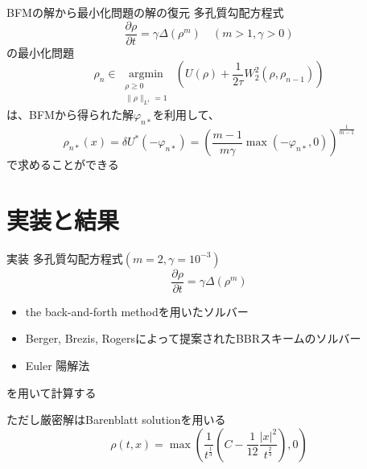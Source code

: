 \documentclass[dvipdfmx, 12pt]{beamer}
\begin{document}
\begin{frame}{BFMの解から最小化問題の解の復元}
    多孔質勾配方程式
    \[
        \frac{\partial \rho}{\partial t} = \gamma \Delta(\rho^m) \quad (m > 1, \gamma > 0)
    \]
    の最小化問題
    \[
        \rho_n \in \underset{{\substack{\rho \ge 0 \\ \|\rho\|_{L^1} = 1}}}{\operatorname{argmin}}\, \left(U(\rho) + \frac{1}{2\tau} W_2^2(\rho, \rho_{n-1})\right)
    \]
    は、BFMから得られた解\(\varphi_{n*}\)を利用して、
    \[
        \rho_{n*}(x) = \delta U^*(- \varphi_{n*}) = \left( \frac{m - 1}{m \gamma} \max(- \varphi_{n*}, 0)\right)^{\frac{1}{m-1}}
    \]
    で求めることができる
\end{frame}


\section{実装と結果}
\begin{frame}{実装}
    多孔質勾配方程式$(m=2, \gamma = 10^{-3})$
    \[
        \frac{\partial \rho}{\partial t} = \gamma \Delta(\rho^m)
    \]
    \begin{itemize}
        \item the back-and-forth methodを用いたソルバー
        \item Berger, Brezis, Rogers\cite{M2AN_1979__13_4_297_0}によって提案されたBBRスキームのソルバー
        \item Euler 陽解法
    \end{itemize}
    を用いて計算する

\vspace\baselineskip
    ただし厳密解はBarenblatt solutionを用いる
    \[
        \rho(t,x)= \max\left(\frac{1}{t^{\frac{1}{3}}}\left(C  - \frac{1}{12} \frac{ |x|^2}{t^{\frac{2}{3}}} \right), 0\right)
    \]

\end{frame}
\end{document}
